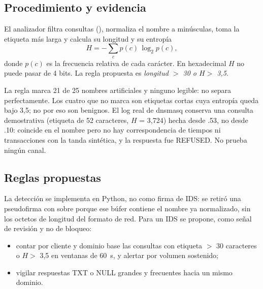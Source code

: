 \subsection{Procedimiento y evidencia}
El analizador filtra consultas (), normaliza el nombre a minúsculas, toma la etiqueta más larga y calcula su longitud y su entropía
\[ H = -\sum_{c} p(c)\,\log_2 p(c), \]
donde $p(c)$ es la frecuencia relativa de cada carácter. En hexadecimal $H$ no puede pasar de 4 bits. La regla propuesta es \emph{longitud $>$ 30 o $H >$ 3,5}.


La regla marca 21 de 25 nombres artificiales y ninguno legible: no separa perfectamente. Los cuatro que no marca son etiquetas cortas cuya entropía queda bajo 3,5; no por eso son benignos. El log real de dnsmasq conserva una consulta demostrativa (etiqueta de 52 caracteres, $H$ = 3,724) hecha desde .53, no desde .10: coincide en el nombre pero no hay correspondencia de tiempos ni transacciones con la tanda sintética, y la respuesta fue REFUSED. No prueba ningún canal.

\subsection{Reglas propuestas}
La detección se implementa en Python, no como firma de IDS: se retiró una pseudofirma con  sobre  porque ese búfer contiene el nombre ya normalizado, sin los octetos de longitud del formato de red. Para un IDS se propone, como señal de revisión y no de bloqueo:
\begin{itemize}
\item contar por cliente y dominio base las consultas con etiqueta $>$ 30 caracteres o $H >$ 3,5 en ventanas de 60~s, y alertar por volumen sostenido;
\item vigilar respuestas TXT o NULL grandes y frecuentes hacia un mismo dominio.
\end{itemize}

